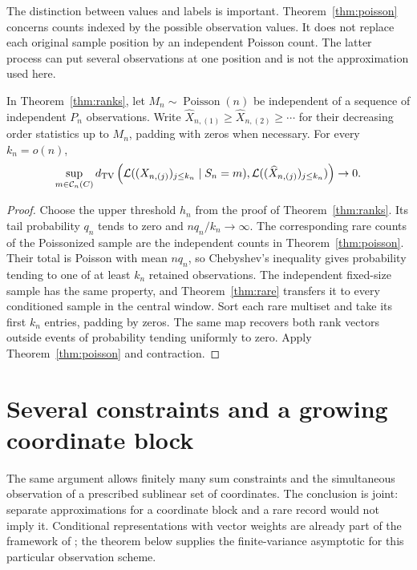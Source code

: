 The distinction between values and labels is important. Theorem~\ref{thm:poisson} concerns counts indexed by the possible observation values. It does not replace each original sample position by an independent Poisson count. The latter process can put several observations at one position and is not the approximation used here.

\begin{corollary}\label{cor:poissonranks}
In Theorem~\ref{thm:ranks}, let $M_n\sim\operatorname{Poisson}(n)$ be independent of a sequence of independent $P_n$ observations. Write $\widehat X_{n,(1)}\ge\widehat X_{n,(2)}\ge\cdots$ for their decreasing order statistics up to $M_n$, padding with zeros when necessary. For every $k_n=o(n)$,
\[
 \sup_{m\in\mathcal C_n(C)}
 d_{\mathrm{TV}}\left(\mathcal L((X_{n,(j)})_{j\le k_n}\mid S_n=m),
          \mathcal L((\widehat X_{n,(j)})_{j\le k_n})\right)\to0.
\]
\end{corollary}
\begin{proof}
Choose the upper threshold $h_n$ from the proof of Theorem~\ref{thm:ranks}. Its tail probability $q_n$ tends to zero and $nq_n/k_n\to\infty$. The corresponding rare counts of the Poissonized sample are the independent counts in Theorem~\ref{thm:poisson}. Their total is Poisson with mean $nq_n$, so Chebyshev's inequality gives probability tending to one of at least $k_n$ retained observations. The independent fixed-size sample has the same property, and Theorem~\ref{thm:rare} transfers it to every conditioned sample in the central window. Sort each rare multiset and take its first $k_n$ entries, padding by zeros. The same map recovers both rank vectors outside events of probability tending uniformly to zero. Apply Theorem~\ref{thm:poisson} and contraction.
\end{proof}

\section{Several constraints and a growing coordinate block}\label{sec:vector}
The same argument allows finitely many sum constraints and the simultaneous observation of a prescribed sublinear set of coordinates. The conclusion is joint: separate approximations for a coordinate block and a rare record would not imply it. Conditional representations with vector weights are already part of the framework of \cite{AT}; the theorem below supplies the finite-variance asymptotic for this particular observation scheme.

